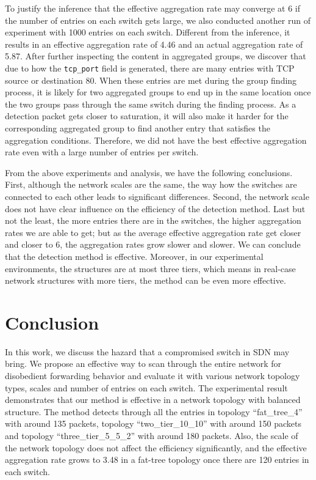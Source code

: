 \documentclass[conference]{IEEEtran}
\begin{document}
To justify the inference that the effective aggregation rate may converge at 6 if the number of entries on each switch gets large, we also conducted another run of experiment with 1000 entries on each switch. Different from the inference, it results in an effective aggregation rate of 4.46 and an actual aggregation rate of 5.87. After further inspecting the content in aggregated groups, we discover that due to how the \texttt{tcp\_port} field is generated, there are many entries with TCP source or destination 80. When these entries are met during the group finding process, it is likely for two aggregated groups to end up in the same location once the two groups pass through the same switch during the finding process. As a detection packet gets closer to saturation, it will also make it harder for the corresponding aggregated group to find another entry that satisfies the aggregation conditions. Therefore, we did not have the best effective aggregation rate even with a large number of entries per switch. 

From the above experiments and analysis, we have the following conclusions. First, although the network scales are the same, the way how the switches are connected to each other leads to significant differences. Second, the network scale does not have clear influence on the efficiency of the detection method. Last but not the least, the more entries there are in the switches, the higher aggregation rates we are able to get; but as the average effective aggregation rate get closer and closer to 6, the aggregation rates grow slower and slower. We can conclude that the detection method is effective. Moreover, in our experimental environments, the structures are at most three tiers, which means in real-case network structures with more tiers, the method can be even more effective.  

\section{Conclusion}
\label{conclusion}
In this work, we discuss the hazard that a compromised switch in SDN may bring. We propose an effective way to scan through the entire network for disobedient forwarding behavior and evaluate it with various network topology types, scales and number of entries on each switch. The experimental result demonstrates that our method is effective in a network topology with balanced structure. The method detects through all the entries in topology ``fat\_tree\_4'' with around 135 packets, topology ``two\_tier\_10\_10'' with around 150 packets and topology ``three\_tier\_5\_5\_2'' with around 180 packets. Also, the scale of the network topology does not affect the efficiency significantly, and the effective aggregation rate grows to 3.48 in a fat-tree topology once there are 120 entries in each switch. 
\end{document}
